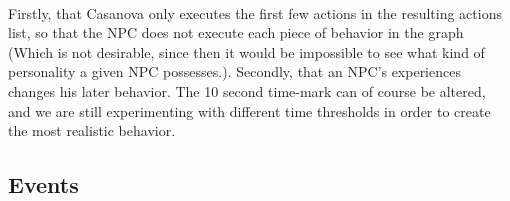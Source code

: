 \documentclass[11pt]{article} %
\begin{document}
~\\
Firstly, that Casanova only executes the first few actions in the resulting actions list, so that the NPC does not execute each piece of behavior in the graph (Which is not desirable, since then it would be impossible to see what kind of personality a given NPC possesses.). 
Secondly, that an NPC's experiences changes his later behavior. %
The 10 second time-mark can of course be altered, and we are still experimenting with different time thresholds in order to create the most realistic behavior.

\newpage
\subsection{Events}
\end{document}
